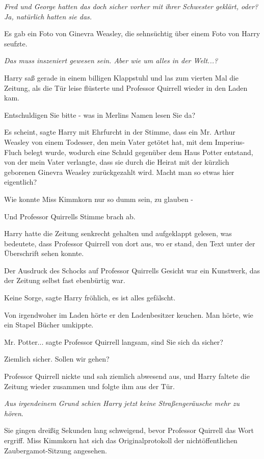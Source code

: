 \emph{Fred und George hatten das doch sicher vorher mit ihrer Schwester geklärt,
oder? Ja, natürlich hatten sie das.}

Es gab ein Foto von Ginevra Weasley, die sehnsüchtig über einem Foto von Harry
seufzte.

\emph{Das muss inszeniert gewesen sein. Aber wie um alles in der Welt...?}

Harry saß gerade in einem billigen Klappstuhl und las zum vierten Mal die
Zeitung, als die Tür leise flüsterte und Professor Quirrell wieder in den Laden
kam.

\glqq{}Entschuldigen Sie bitte - was in Merlins Namen lesen Sie da?\grqq{}

\glqq{}Es scheint\grqq{}, sagte Harry mit Ehrfurcht in der Stimme, \glqq{}dass
ein Mr. Arthur Weasley von einem Todesser, den mein Vater getötet hat, mit dem
Imperius-Fluch belegt wurde, wodurch eine Schuld gegenüber dem Haus Potter
entstand, von der mein Vater verlangte, dass sie durch die Heirat mit der
kürzlich geborenen Ginevra Weasley zurückgezahlt wird. Macht man so etwas hier
eigentlich?\grqq{}

\glqq{}Wie konnte Miss Kimmkorn nur so dumm sein, zu glauben -\grqq{}

Und Professor Quirrells Stimme brach ab.

Harry hatte die Zeitung senkrecht gehalten und aufgeklappt gelesen, was
bedeutete, dass Professor Quirrell von dort aus, wo er stand, den Text unter der
Überschrift sehen konnte.

Der Ausdruck des Schocks auf Professor Quirrells Gesicht war ein Kunstwerk, das
der Zeitung selbst fast ebenbürtig war.

\glqq{}Keine Sorge\grqq{}, sagte Harry fröhlich, \glqq{}es ist alles
gefälscht.\grqq{}

Von irgendwoher im Laden hörte er den Ladenbesitzer keuchen. Man hörte, wie ein
Stapel Bücher umkippte.

\glqq{}Mr. Potter...\grqq{} sagte Professor Quirrell langsam, \glqq{}sind Sie
sich da sicher?\grqq{}

\glqq{}Ziemlich sicher. Sollen wir gehen?\grqq{}

Professor Quirrell nickte und sah ziemlich abwesend aus, und Harry faltete die
Zeitung wieder zusammen und folgte ihm aus der Tür.

\emph{Aus irgendeinem Grund schien Harry jetzt keine Straßengeräusche mehr zu
hören}.

Sie gingen dreißig Sekunden lang schweigend, bevor Professor Quirrell das Wort
ergriff. \glqq{}Miss Kimmkorn hat sich das Originalprotokoll der
nichtöffentlichen Zaubergamot-Sitzung angesehen.\grqq{}

